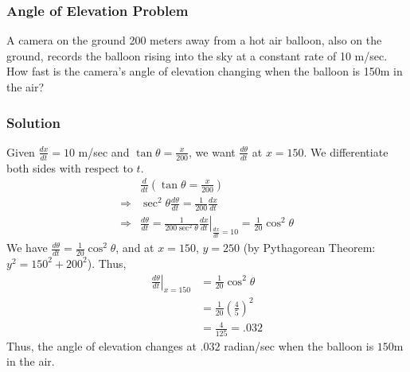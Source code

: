 \documentclass[11pt]{article}
\begin{document}
\subsubsection{Angle of Elevation Problem}
A camera on the ground 200 meters away from a hot air balloon, also on the ground, records the balloon rising into the sky at a constant rate of 10 m/sec. How fast is the camera's angle of elevation changing when the balloon is 150m in the air? 
\begin{center}
\end{center}
\subsubsection*{Solution}
Given $\displaystyle\frac{dx}{dt}=10$ m/sec and $\displaystyle\tan\theta = \frac{x}{200}$, we want $\displaystyle\frac{d\theta}{dt}$ at $x=150$. We differentiate both sides with respect to $t$. 
\[
    \begin{split}
        &\frac{d}{dt}\left(\tan\theta = \frac{x}{200}\right)\\[.5em]
        \Rightarrow&\sec^2\theta\frac{d\theta}{dt}=\frac{1}{200}\frac{dx}{dt}\\[.5em]
        \Rightarrow&\frac{d\theta}{dt}=\left.\frac{1}{200\sec^2\theta}\frac{dx}{dt}\right|_{\frac{dx}{dt}=10}=\frac{1}{20}\cos^2\theta
    \end{split}
\]
We have $\displaystyle\frac{d\theta}{dt}=\frac{1}{20}\cos^2\theta$, and at $x=150$, $y=250$ (by Pythagorean Theorem: $y^2=150^2+200^2$).
Thus, 
\[
    \begin{split}
        \left.\frac{d\theta}{dt}\right|_{x=150}&=\frac{1}{20}\cos^2\theta\\[.5em]
        &=\frac{1}{20}\left(\frac{4}{5}\right)^2\\[.5em]
        &=\frac{4}{125}= .032 
    \end{split}
\]
Thus, the angle of elevation changes at $.032$ radian/sec when the balloon is $150$m in the air.
\end{document}
